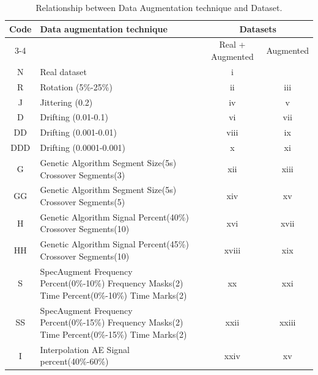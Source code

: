 \documentclass[journal]{IEEEtran}
\begin{document}
\begin{table}
\caption{Relationship between Data Augmentation technique and Dataset.}
\centering
\begin{tabular}{clcc}
\hline\hline
  \multirow{2}{*}{Code} & \multirow{2}{*}{Data augmentation technique} & \multicolumn{2}{c}{ Datasets } \\
  \cline{3-4}
 &  & 
  Real + Augmented
   & 
  Augmented
   \\
\hline
N & Real dataset & i & ~ \\
R & Rotation (5\%-25\%) & ii & iii \\
J & Jittering (0.2) & iv & v \\
D & Drifting (0.01-0.1) & vi & vii \\
DD & Drifting (0.001-0.01) & viii & ix \\
DDD & Drifting (0.0001-0.001) & x & xi \\
G & Genetic Algorithm Segment Size(5s) Crossover Segments(3) & xii & xiii \\
GG & Genetic Algorithm Segment Size(5s) Crossover Segments(5) & xiv & xv \\
H & Genetic Algorithm Signal Percent(40\%) Crossover Segments(10) & xvi & xvii \\
HH & Genetic Algorithm Signal Percent(45\%) Crossover Segments(10) & xviii & xix \\
S & SpecAugment Frequency Percent(0\%-10\%) Frequency Masks(2) Time Percent(0\%-10\%) Time Marks(2) & xx & xxi \\
SS & SpecAugment Frequency Percent(0\%-15\%) Frequency Masks(2) Time Percent(0\%-15\%) Time Marks(2) & xxii & xxiii \\
I & Interpolation AE Signal percent(40\%-60\%) & xxiv & xv \\
\hline
\end{tabular}
\label{table:code_dataset}
\end{table}
\end{document}
